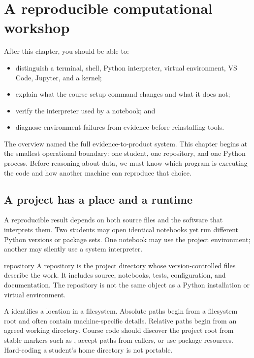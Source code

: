 \chapter{A reproducible computational workshop}
\label{ch:workshop}

\begin{learningobjectives}
After this chapter, you should be able to:
\begin{itemize}
  \item distinguish a terminal, shell, Python interpreter, virtual environment,
  VS Code, Jupyter, and a kernel;
  \item explain what the course setup command changes and what it does not;
  \item verify the interpreter used by a notebook; and
  \item diagnose environment failures from evidence before reinstalling tools.
\end{itemize}
\end{learningobjectives}

\begin{chapterconnection}
The overview named the full evidence-to-product system. This chapter begins at
the smallest operational boundary: one student, one repository, and one Python
process. Before reasoning about data, we must know which program is executing
the code and how another machine can reproduce that choice.
\end{chapterconnection}

\section{A project has a place and a runtime}

A reproducible result depends on both source files and the software that
interprets them. Two students may open identical notebooks yet run different
Python versions or package sets. One notebook may use the project environment;
another may silently use a system interpreter.

\begin{definitionbox}{repository}
A repository is the project directory whose version-controlled files describe
the work. It includes source, notebooks, tests, configuration, and documentation.
The repository is not the same object as a Python installation or virtual
environment.
\end{definitionbox}

A  identifies a location in a filesystem. Absolute paths begin from
a filesystem root and often contain machine-specific details. Relative paths
begin from an agreed working directory. Course code should discover the project
root from stable markers such as , accept paths from
callers, or use package resources. Hard-coding a student's home directory is
not portable.

